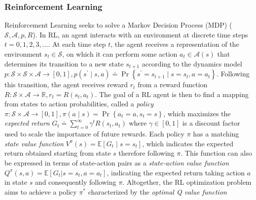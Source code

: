 \subsubsection{Reinforcement Learning}\label{sec:RL_BG}
Reinforcement Learning seeks to solve a Markov Decision Process
(MDP) ($\mathcal{S},\mathcal{A},p,R$). In
RL, an agent interacts with an environment at
discrete time steps $t=0,1,2,3,\ldots$. At each time step $t$, the
agent receives a representation of the environment $s_t \in
\mathcal{S}$, on which it can perform some action $a_t \in
\mathcal{A}(s)$ that determines its transition to a new state
$s_{t+1}$ according to the dynamics model
$p\colon\mathcal{S}\times\mathcal{S}\times\mathcal{A}\rightarrow
\left[0,1\right],p\left(s^\prime\mid
  s,a\right)\doteq\Pr\left\{s^\prime=s_{t+1}\mid
  s=s_t,a=a_t\right\}$. Following this transition, the agent receives
reward $r_t$ from a reward function
$R\colon\mathcal{S}\times\mathcal{A}\rightarrow\mathbb{R},
r_t=R\left(s_t,a_t\right)$. The goal of a RL agent is then to find
a mapping from states to action probabilities, called a \textit{policy}
$\pi\colon\mathcal{S}\times\mathcal{A}\rightarrow\left[0,1\right],
\pi\left(a\mid s\right)=\Pr\left\{a_t=a,s_t=s\right\}$, which
maximizes the \textit{expected return} $G_t\doteq
\sum_{t=0}^{\infty}\gamma^{t}R\left(s_t,a_t\right)$ where
$\gamma\in\left[0,1\right]$ is a discount factor used to scale the
importance of future rewards. Each policy $\pi$ has a matching
\textit{state value function}
$V^{\pi}\left(s\right)=\mathbb{E}\left[G_t\mid s=s_t\right]$, which
indicates the expected return obtained starting from state $s$ therefore
following $\pi$. This function can also be expressed in terms of
state-action pairs as a \textit{state-action value function}
$Q^{\pi}\left(s,a\right)=\mathbb{E}\left[G_t|s=s_t,a=a_t\right]$,
indicating the expected return taking action $a$ in state $s$ and
consequently following $\pi$. Altogether, the RL optimization problem aims
to achieve a policy $\pi^*$ characterized by the \textit{optimal Q
  value function}
